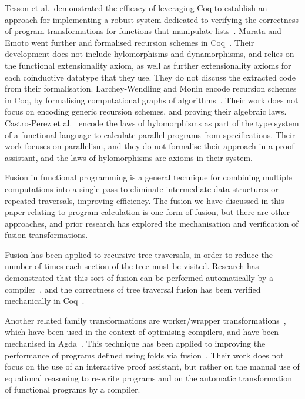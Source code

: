 \documentclass[a4paper,anonymous, UKenglish,cleveref, autoref, thm-restate]{lipics-v2021}
\begin{document}
Tesson et al.\ demonstrated the efficacy of leveraging Coq to establish an
approach for implementing a robust system dedicated to verifying the correctness
of program transformations for functions that manipulate
lists~\cite{10.1007/978-3-642-17796-5_10}. Murata and Emoto went further and
formalised recursion schemes in Coq~\cite{MurataE19}. Their development does not
include hylomorphisms and dynamorphisms, and relies on the functional
extensionality axiom, as well as further extensionality axioms for each
coinductive datatype that they use. They do not discuss the extracted code
from their formalisation. Larchey-Wendling and Monin encode recursion schemes in
Coq, by formalising computational graphs of algorithms~\cite{larchey2022braga}.
Their work does not focus on encoding generic recursion schemes, and proving
their algebraic laws. Castro-Perez et al.~\cite{farmsCastro} encode the laws of
hylomorphisms as part of the type system of a functional language to calculate
parallel programs from specifications. Their work focuses on parallelism, and
they do not formalise their approach in a proof assistant, and the laws of
hylomorphisms are axioms in their system.

Fusion in functional programming is a general technique for combining multiple
computations into a single pass to eliminate intermediate data structures or
repeated traversals, improving efficiency. The fusion we have discussed in this
paper relating to program calculation is one form of fusion, but there are other
approaches, and prior research has explored the mechanisation and verification
of fusion transformations.

Fusion has been applied to recursive tree traversals, in order to reduce the
number of times each section of the tree must be visited. Research has
demonstrated that this sort of fusion can be performed automatically by a
compiler~\cite{10.1145/3133900}, and the correctness of tree traversal fusion
has been verified mechanically in Coq~\cite{10.1145/3377555.3377884}.

Another related family transformations are worker/wrapper
transformations~\cite{gill09}, which have been used in the context of optimising
compilers, and have been mechanised in Agda~\cite{SCULTHORPE_HUTTON_2014}. This
technique has been applied to improving the performance of programs defined
using folds via fusion~\cite{hutton10}. Their work does not focus on the use of
an interactive proof assistant, but rather on the manual use of equational
reasoning to re-write programs and on the automatic transformation of functional
programs by a compiler.
\end{document}
